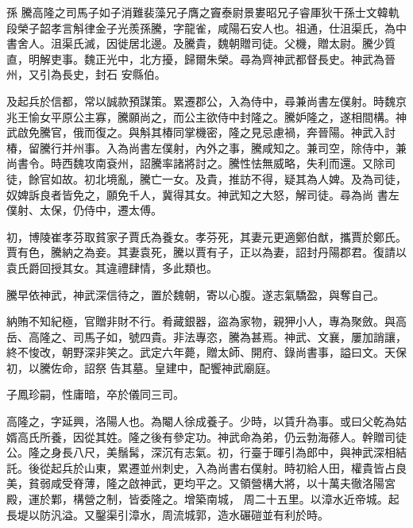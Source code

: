 
\begin{pinyinscope}

 孫
 騰高隆之司馬子如子消難裴藻兄子膺之竇泰尉景婁昭兄子睿厙狄干孫士文韓軌段榮子韶孝言斛律金子光羨孫騰，字龍雀，咸陽石安人也。祖通，仕沮渠氏，為中書舍人。沮渠氏滅，因徙居北邊。及騰貴，魏朝贈司徒。父機，贈太尉。騰少質直，明解吏事。魏正光中，北方擾，歸爾朱榮。尋為齊神武都督長史。神武為晉州，又引為長史，封石
 安縣伯。



 及起兵於信都，常以誠款預謀策。累遷郡公，入為侍中，尋兼尚書左僕射。時魏京兆王愉女平原公主寡，騰願尚之，而公主欲侍中封隆之。騰妒隆之，遂相間構。神武啟免騰官，俄而復之。與斛其椿同掌機密，隆之見忌慮禍，奔晉陽。神武入討椿，留騰行并州事。入為尚書左僕射，內外之事，騰咸知之。兼司空，除侍中，兼尚書令。時西魏攻南袞州，詔騰率諸將討之。騰性怯無威略，失利而還。又除司徒，餘官如故。初北境亂，騰亡一女。及貴，推訪不得，疑其為人婢。及為司徒，奴婢訴良者皆免之，願免千人，冀得其女。神武知之大怒，解司徒。尋為尚
 書左僕射、太保，仍侍中，遷太傅。



 初，博陵崔孝芬取貧家子賈氏為養女。孝芬死，其妻元更適鄭伯猷，攜賈於鄭氏。賈有色，騰納之為妾。其妻袁死，騰以賈有子，正以為妻，詔封丹陽郡君。復請以袁氏爵回授其女。其違禮肆情，多此類也。



 騰早依神武，神武深信待之，置於魏朝，寄以心腹。遂志氣驕盈，與奪自己。



 納賄不知紀極，官贈非財不行。肴藏銀器，盜為家物，親狎小人，專為聚斂。與高岳、高隆之、司馬子如，號四貴。非法專恣，騰為甚焉。神武、文襄，屢加誚讓，終不悛改，朝野深非笑之。武定六年薨，贈太師、開府、錄尚書事，謚曰文。天保初，以騰佐命，詔祭
 告其墓。皇建中，配饗神武廟庭。



 子鳳珍嗣，性庸暗，卒於儀同三司。



 高隆之，字延興，洛陽人也。為閹人徐成養子。少時，以賃升為事。或曰父乾為姑婿高氏所養，因從其姓。隆之後有參定功。神武命為弟，仍云勃海蓚人。幹贈司徒公。隆之身長八尺，美鬚髯，深沉有志氣。初，行臺于暉引為郎中，與神武深相結託。後從起兵於山東，累遷並州刺史，入為尚書右僕射。時初給人田，權貴皆占良美，貧弱咸受脊薄，隆之啟神武，更均平之。又領營構大將，以十萬夫徹洛陽宮殿，運於鄴，構營之制，皆委隆之。增築南城，
 周二十五里。以漳水近帝城。起長堤以防汎溢。又鑿渠引漳水，周流城郭，造水碾磑並有利於時。




\end{pinyinscope}
